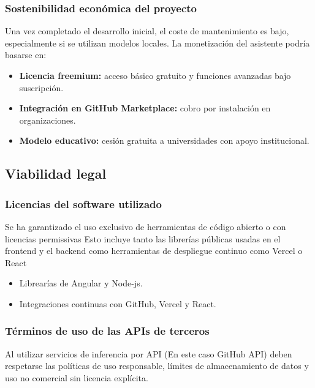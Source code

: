 \subsubsection{Sostenibilidad económica del proyecto}

Una vez completado el desarrollo inicial, el coste de mantenimiento es bajo, especialmente si se utilizan modelos locales. La monetización del asistente podría basarse en:

\begin{itemize}
	\item \textbf{Licencia freemium:} acceso básico gratuito y funciones avanzadas bajo suscripción.
	\item \textbf{Integración en GitHub Marketplace:} cobro por instalación en organizaciones.
	\item \textbf{Modelo educativo:} cesión gratuita a universidades con apoyo institucional.
\end{itemize}

\subsection{Viabilidad legal}

\subsubsection{Licencias del software utilizado}

Se ha garantizado el uso exclusivo de herramientas de código abierto o con licencias permissivas  Esto incluye tanto las librerías públicas usadas en el frontend y el backend como herramientas de despliegue continuo como Vercel o React

\begin{itemize}
	\item Librearías de Angular y Node-js.
	\item Integraciones continuas con GitHub, Vercel y React.
\end{itemize}

\subsubsection{Términos de uso de las APIs de terceros}

Al utilizar servicios de inferencia por API (En este caso GitHub API) deben respetarse las políticas de uso responsable, límites de almacenamiento de datos y uso no comercial sin licencia explícita.

